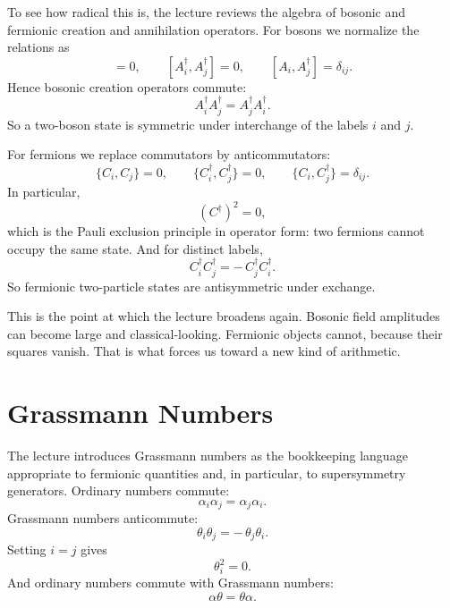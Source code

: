 To see how radical this is, the lecture reviews the algebra of bosonic and fermionic creation and annihilation operators. For bosons we normalize the relations as
\begin{equation}
[A_i,A_j]=0,
\qquad
[A_i^\dagger,A_j^\dagger]=0,
\qquad
[A_i,A_j^\dagger]=\delta_{ij}.
\end{equation}
Hence bosonic creation operators commute:
\begin{equation}
A_i^\dagger A_j^\dagger = A_j^\dagger A_i^\dagger.
\end{equation}
So a two-boson state is symmetric under interchange of the labels \(i\) and \(j\).

For fermions we replace commutators by anticommutators:
\begin{equation}
\{C_i,C_j\}=0,
\qquad
\{C_i^\dagger,C_j^\dagger\}=0,
\qquad
\{C_i,C_j^\dagger\}=\delta_{ij}.
\end{equation}
In particular,
\begin{equation}
(C^\dagger)^2=0,
\end{equation}
which is the Pauli exclusion principle in operator form: two fermions cannot occupy the same state. And for distinct labels,
\begin{equation}
C_i^\dagger C_j^\dagger = -\,C_j^\dagger C_i^\dagger.
\end{equation}
So fermionic two-particle states are antisymmetric under exchange.

This is the point at which the lecture broadens again. Bosonic field amplitudes can become large and classical-looking. Fermionic objects cannot, because their squares vanish. That is what forces us toward a new kind of arithmetic.

\section{Grassmann Numbers}

The lecture introduces Grassmann numbers as the bookkeeping language appropriate to fermionic quantities and, in particular, to supersymmetry generators. Ordinary numbers commute:
\begin{equation}
\alpha_i\alpha_j=\alpha_j\alpha_i.
\end{equation}
Grassmann numbers anticommute:
\begin{equation}
\theta_i\theta_j=-\,\theta_j\theta_i.
\end{equation}
Setting \(i=j\) gives
\begin{equation}
\theta_i^2=0.
\end{equation}
And ordinary numbers commute with Grassmann numbers:
\begin{equation}
\alpha\theta=\theta\alpha.
\end{equation}

